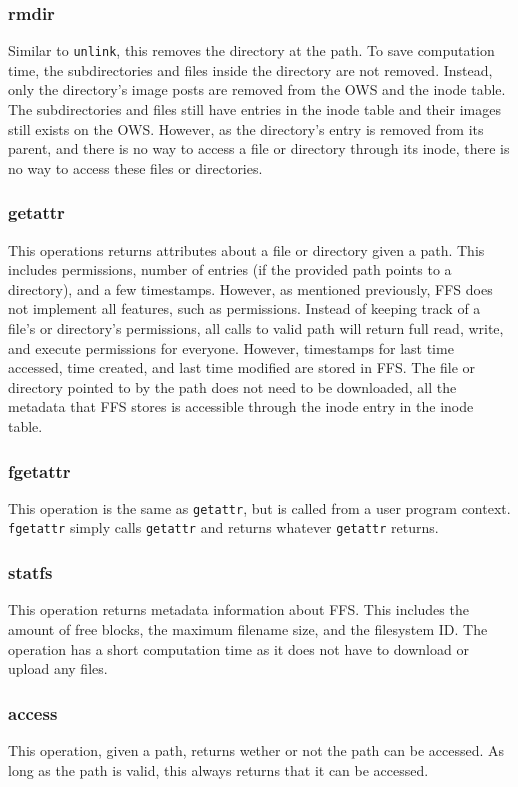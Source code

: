 \subsubsection{rmdir}
Similar to \texttt{unlink}, this removes the directory at the path. To save computation time, the subdirectories and files inside the directory are not removed. Instead, only the directory's image posts are removed from the OWS and the inode table. The subdirectories and files still have entries in the inode table and their images still exists on the OWS. However, as the directory's entry is removed from its parent, and there is no way to access a file or directory through its inode, there is no way to access these files or directories.

\subsubsection{getattr}
This operations returns attributes about a file or directory given a path. This includes permissions, number of entries (if the provided path points to a directory), and a few timestamps. However, as mentioned previously, FFS does not implement all features, such as permissions. Instead of keeping track of a file's or directory's permissions, all calls to valid path will return full read, write, and execute permissions for everyone. However, timestamps for last time accessed, time created, and last time modified are stored in FFS. The file or directory pointed to by the path does not need to be downloaded, all the metadata that FFS stores is accessible through the inode entry in the inode table.

\subsubsection{fgetattr}
This operation is the same as \texttt{getattr}, but is called from a user program context. \texttt{fgetattr} simply calls \texttt{getattr} and returns whatever \texttt{getattr} returns.

\subsubsection{statfs}
This operation returns metadata information about FFS. This includes the amount of free blocks, the maximum filename size, and the filesystem ID. The operation has a short computation time as it does not have to download or upload any files.

\subsubsection{access}
This operation, given a path, returns wether or not the path can be accessed. As long as the path is valid, this always returns that it can be accessed.

